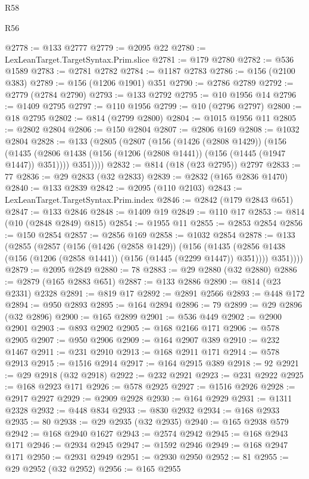 \begin{lexlean}{R58}
\begin{lexlean}{R56}
\begin{coremodule}
{{{{{{{{{{{{{{{{{{{{{{{{{{{{{{{{{{{{{{{{{{{{{{{{{{{{{{{{{{{{{{{{{{{{{{{{{{{{{{{{{{{{{{{{{{{{{{{{{{{{{{{{{{{{{{{{{{{{{{{{{{{{{{{{{{{{{{{{{{{{{{{{{{{{{{{{{{{{{{{{{{{{{{{{{{{{{{{{{{{{{{{{{{{{{{{{{{{{{{{{{{{{{{{{{{{@2778 := @133 @2777
@2779 := @2095 @22
@2780 := LexLeanTarget.TargetSyntax.Prim.slice
@2781 := @179 @2780
@2782 := @536 @1589
@2783 := @2781 @2782
@2784 := @1187 @2783
@2786 := @156 (@2100 @383)
@2789 := @156 (@1206 @1901) @351
@2790 := @2786 @2789
@2792 := @2779 (@2784 @2790)
@2793 := @133 @2792
@2795 := @10 @1956 @14
@2796 := @1409 @2795
@2797 := @110 @1956
@2799 := @10 (@2796 @2797)
@2800 := @18 @2795
@2802 := @814 (@2799 @2800)
@2804 := @1015 @1956 @11
@2805 := @2802 @2804
@2806 := @150 @2804
@2807 := @2806 @169
@2808 := @1032 @2804
@2828 := @133
    (@2805
      (@2807
        (@156
          (@1426 (@2808 @1429))
          (@156
            (@1435 (@2806 @1438 (@156 (@1206 (@2808 @1441)) (@156 (@1445 (@1947 @1447)) @351))))
            @351))))
@2832 := @814 (@18 (@23 @2795)) @2797
@2833 := 77
@2836 := @29 @2833 (@32 @2833)
@2839 := @2832 (@165 @2836 @1470)
@2840 := @133 @2839
@2842 := @2095 (@110 @2103)
@2843 := LexLeanTarget.TargetSyntax.Prim.index
@2846 := @2842 (@179 @2843 @651)
@2847 := @133 @2846
@2848 := @1409 @19
@2849 := @110 @17
@2853 := @814 (@10 (@2848 @2849) @815)
@2854 := @1955 @11
@2855 := @2853 @2854
@2856 := @150 @2854
@2857 := @2856 @169
@2858 := @1032 @2854
@2878 := @133
    (@2855
      (@2857
        (@156
          (@1426 (@2858 @1429))
          (@156
            (@1435 (@2856 @1438 (@156 (@1206 (@2858 @1441)) (@156 (@1445 (@2299 @1447)) @351))))
            @351))))
@2879 := @2095 @2849
@2880 := 78
@2883 := @29 @2880 (@32 @2880)
@2886 := @2879 (@165 @2883 @651)
@2887 := @133 @2886
@2890 := @814 (@23 @2331) @2328
@2891 := @819 @17
@2892 := @2891 @2566
@2893 := @448 @172
@2894 := @950 @2893
@2895 := @164 @2894
@2896 := 79
@2899 := @29 @2896 (@32 @2896)
@2900 := @165 @2899
@2901 := @536 @449
@2902 := @2900 @2901
@2903 := @893 @2902
@2905 := @168 @2166 @171
@2906 := @578 @2905
@2907 := @950 @2906
@2909 := @164 @2907 @389
@2910 := @232 @1467
@2911 := @231 @2910
@2913 := @168 @2911 @171
@2914 := @578 @2913
@2915 := @1516 @2914
@2917 := @164 @2915 @389
@2918 := 92
@2921 := @29 @2918 (@32 @2918)
@2922 := @232 @2921
@2923 := @231 @2922
@2925 := @168 @2923 @171
@2926 := @578 @2925
@2927 := @1516 @2926
@2928 := @2917 @2927
@2929 := @2909 @2928
@2930 := @164 @2929
@2931 := @1311 @2328
@2932 := @448 @834
@2933 := @830 @2932
@2934 := @168 @2933
@2935 := 80
@2938 := @29 @2935 (@32 @2935)
@2940 := @165 @2938 @579
@2942 := @168 @2940 @1627
@2943 := @2574 @2942
@2945 := @168 @2943 @171
@2946 := @2934 @2945
@2947 := @1592 @2946
@2949 := @168 @2947 @171
@2950 := @2931 @2949
@2951 := @2930 @2950
@2952 := 81
@2955 := @29 @2952 (@32 @2952)
@2956 := @165 @2955
}}}}}}}}}}}}}}}}}}}}}}}}}}}}}}}}}}}}}}}}}}}}}}}}}}}}}}}}}}}}}}}}}}}}}}}}}}}}}}}}}}}}}}}}}}}}}}}}}}}}}}}}}}}}}}}}}}}}}}}}}}}}}}}}}}}}}}}}}}}}}}}}}}}}}}}}}}}}}}}}}}}}}}}}}}}}}}}}}}}}}}}}}}}}}}}}}}}}}}}}}}}}}}}}}}}
\end{coremodule}
\end{lexlean}
\end{lexlean}
